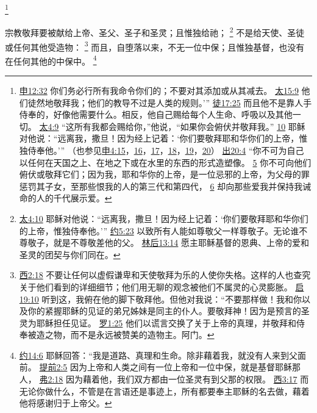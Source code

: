\documentclass[12pt, a4paper, oneside]{ctexart}
\newcounter{parnum}[section]
\newcommand{\N}{%
   \noindent\refstepcounter{parnum}%
    \makebox[\parindent][l]{\textbf{\arabic{parnum}.}}}
\begin{document}
	\footnote {
		\href{https://biblehub.com/deuteronomy/12-32.htm}{申12:32} 你们务必行所有我命令你们的；不要对其添加或从其减去。
		\href{https://biblehub.com/matthew/15-9.htm}{太15:9} 他们徒然地敬拜我；他们的教导不过是人类的规则。’”
		\href{https://biblehub.com/acts/17-25.htm}{徒17:25} 而且他不是靠人手侍奉的，好像他需要什么。相反，他自己赐给每个人生命、呼吸以及其他一切。 
		\href{https://biblehub.com/matthew/4-9.htm}{太4:9} “这所有我都会赐给你，”他说，“如果你会俯伏并敬拜我。”
		\href{https://biblehub.com/matthew/4-10.htm}{10} 耶稣对他说：“远离我，撒旦！因为经上记着：‘你们要敬拜耶和华你们的上帝，惟独侍奉他。’”
		（也参见\href{https://biblehub.com/deuteronomy/4-15.htm}{申4:15}，\href{https://biblehub.com/deuteronomy/4-16.htm}{16}，\href{https://biblehub.com/deuteronomy/4-17.htm}{17}，\href{https://biblehub.com/deuteronomy/4-18.htm}{18}，\href{https://biblehub.com/deuteronomy/4-19.htm}{19}，\href{https://biblehub.com/deuteronomy/4-20.htm}{20}）
		\href{https://biblehub.com/exodus/20-4.htm}{出20:4} “你不可为自己以任何在天国之上、在地之下或在水里的东西的形式造塑像。
		\href{https://biblehub.com/exodus/20-5.htm}{5} 你不可向他们俯伏或敬拜它们；因为我，耶和华你的上帝，是一位忌邪的上帝，为父母的罪惩罚其子女，至那些恨我的人的第三代和第四代，
		\href{https://biblehub.com/exodus/20-6.htm}{6} 却向那些爱我并保持我诫命的人的千代展示爱。
	}

\N 宗教敬拜要被献给上帝、圣父、圣子和圣灵；且惟独给祂；
	\footnote {
		\href{https://biblehub.com/matthew/4-10.htm}{太4:10} 耶稣对他说：“远离我，撒旦！因为经上记着：‘你们要敬拜耶和华你们的上帝，惟独侍奉他。’”
		\href{https://biblehub.com/john/5-23.htm}{约5:23} 以致所有人能如尊敬父一样尊敬子。无论谁不尊敬子，就是不尊敬差他的父。
		\href{https://biblehub.com/2_corinthians/13-14.htm}{林后13:14} 愿主耶稣基督的恩典、上帝的爱和圣灵的团契与你们同在。
	}
	不是给天使、圣徒或任何其他受造物：
	\footnote {
		\href{https://biblehub.com/colossians/2-18.htm}{西2:18} 不要让任何以虚假谦卑和天使敬拜为乐的人使你失格。这样的人也查究关于他们看到的详细细节；他们用无聊的观念被他们不属灵的心灵膨胀。
		\href{https://biblehub.com/revelation/19-10.htm}{启19:10} 听到这，我俯在他的脚下敬拜他。但他对我说：“不要那样做！我和你以及你的紧握耶稣的见证的弟兄姊妹是同主的仆人。要敬拜神！因为是预言的圣灵为耶稣担任见证。
		\href{https://biblehub.com/romans/1-25.htm}{罗1:25} 他们以谎言交换了关于上帝的真理，并敬拜和侍奉被造之物，而不是永远被赞美的造物主。阿门。
	}
	而且，自堕落以来，不无一位中保；且惟独基督，也没有在任何其他的中保中。
	\footnote {
		\href{https://biblehub.com/john/14-6.htm}{约14:6} 耶稣回答：“我是道路、真理和生命。除非藉着我，就没有人来到父面前。
		\href{https://biblehub.com/1_timothy/2-5.htm}{提前2:5} 因为上帝和人类之间有一位上帝和一位中保，就是基督耶稣那人，
		\href{https://biblehub.com/ephesians/2-18.htm}{弗2:18} 因为藉着他，我们双方都由一位圣灵有到父那的权限。
		\href{https://biblehub.com/colossians/3-17.htm}{西3:17} 而无论你做什么，不管是在言语还是事迹上，所有都要奉主耶稣的名去做，藉着他将感谢归于上帝父。
	}
\end{document}
